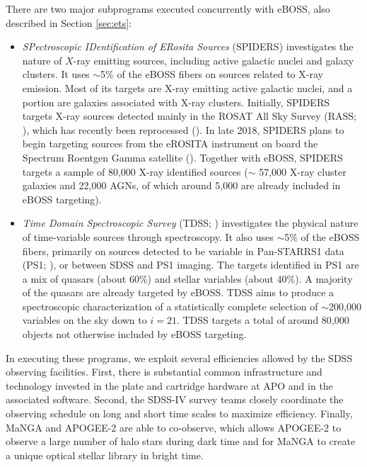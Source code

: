 \begin{itemize}
\end{itemize}

There are two major subprograms executed concurrently with eBOSS, also
described in Section \ref{sec:ets}:

\begin{itemize}
\item 
{\it SPectroscopic IDentification of ERosita Sources} (SPIDERS) 
investigates the nature of $X$-ray emitting sources, including active
galactic nuclei and galaxy clusters. It uses
$\sim$5\% of the eBOSS fibers on sources related to X-ray
emission. Most of its targets are X-ray emitting active galactic
nuclei, and a portion are galaxies associated with X-ray
clusters. Initially, SPIDERS targets X-ray sources detected mainly in
the ROSAT All Sky Survey (RASS; \citealt{voges99a}), which has
recently been reprocessed (\citealt{boller16a}). In late 2018, SPIDERS
plans to begin targeting sources from the eROSITA instrument on board
the Spectrum Roentgen Gamma satellite (\citealt{predehl10a,
merloni12a}). Together with eBOSS, SPIDERS targets a sample of 80,000
X-ray identified sources ($\sim$ 57,000 X-ray cluster galaxies and
22,000 AGNs, of which around 5,000 are already included in
eBOSS targeting).

\item 
{\it Time Domain Spectroscopic Survey} (TDSS; \citealt{morganson15a})
investigates the physical nature of time-variable sources through
spectroscopy.  It also uses $\sim$5\% of the eBOSS fibers, primarily
on sources detected to be variable in Pan-STARRS1 data
(PS1; \citealt{kaiser10a}), or between SDSS and PS1 imaging. The
targets identified in PS1 are a mix of quasars (about 60\%) and
stellar variables (about 40\%). A majority of the quasars are already
targeted by eBOSS. TDSS aims to produce a spectroscopic
characterization of a statistically complete selection of
$\sim$200,000 variables on the sky down to $i=21$. TDSS targets a
total of around 80,000 objects not otherwise included by eBOSS
targeting.

\end{itemize}

In executing these programs, we exploit several efficiencies allowed
by the SDSS observing facilities. First, there is substantial common
infrastructure and technology invested in the plate and cartridge
hardware at APO and in the associated software.  Second, the SDSS-IV
survey teams closely coordinate the observing schedule on long and
short time scales to maximize efficiency. Finally, MaNGA and APOGEE-2
are able to co-observe, which allows APOGEE-2 to observe a large
number of halo stars during dark time and for MaNGA to create a unique
optical stellar library in bright time.

